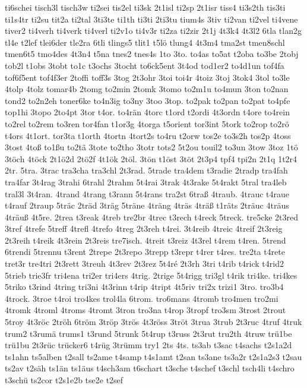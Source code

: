 {ti6schei
tisch3l
tisch3w
ti2sei
tis2el
ti3sk
2t1isl
ti2sp
2t1isr
tiss4
ti3s2th
tis3ti
ti1s4tr
ti2su
tit2a
ti2tal
3ti3te
ti1th
ti3ti
2ti3tu
tium4s
3tiv
ti2van
ti2vel
ti4vene
tiver2
ti4verh
ti4verk
ti4verl
ti2v1o
ti4v3r
ti2za
ti2zir
2t1j
4t3k4
4t3l2
6tla
tlan2g
tl4e
t2lef
tlei6der
tle2ra
6tli
tlings5
tlit1
t5lö
tlung4
4t3m4
tma2st
tmen8schl
tmen6t5
tmo4des
4t3n4
t5na
tnes2
tnes4s
1to
3to.
to4as
to5at
t2oba
to3be
2tobj
tob2l
t1obs
3tobt
to1c
t3ochs
3tocht
to6ck5ent
3t4od
tod1er2
to4d1un
tof4fa
tof6f5ent
tof4f3er
2toffi
toff3s
3tog
2t3ohr
3toi
toi4r
4toiz
3toj
3tok4
3tol
to3le
4tolp
4tolz
tomar4b
2tomg
to2min
2tomk
3tomo
to2m1u
to4mun
3ton
to2nan
tond2
to2n2eh
toner6ke
to4n3ig
to3ny
3too
3top.
to2pak
to2pan
to2pat
to4pfe
top1hi
3topo
2to4pt
3tor
t4or.
to4rän
4torc
t1ord
t2ordi
4t3ordn
t4ore
to4rein
to2rel
to2rem
to3ren
tor4fan
t1or3g
4torga
t5orient
tor3int
5tork
to2rop
to2rö
t4ors
4t1ort.
tor3ta
t1orth
4tortn
4tort2s
to4ru
t2orw
tos2e
to3s2h
tos2p
4toss
3tost
4toß
to1ßu
to2tä
3tote
to2tho
3totr
tots2
5t2ou
touil2
to3un
3tow
3toz
1tö
3töch
4töck
2t1ö2d
2tö2f
4t1ök
2töl.
3tön
t1öst
3töt
2t3p4
tpf4
tpi2n
2t1q
1t2r4
2tr.
5tra.
3trac
tra3cha
tra3chl
2t3rad.
5trade
tra4dem
t3radie
2tradp
tra4fah
tra4far
3t4rag
3trahi
6trahl
2trahm
5t4rai
3trak
4t3rake
5t4rakt
5tral
tra4leb
tral3l
3t4ran.
4trand
4trang
t3rann
5t4rans
tra2st
6traß
4traub.
4trauc
t4raue
t4rauf
2traup
5träc
2träd
3träg
5träne
4träng
4träs
4träß
t1räts
2träuc
4träus
4träuß
4t5re.
2trea
t3reak
4treb
tre2br
4trec
t3rech
t4reck
5treck.
tre5cke
2t3red
3tref
4trefe
5treff
4trefl
4trefo
4treg
2t3reh
t4rei.
3t4reib
4treic
4treif
2t3reig
2t3reih
t4reik
4t3rein
2t3reis
tre7isch.
4treit
t3reiz
4t3rel
t4rem
t4ren.
5trend
6trendi
5trennu
t3rent
2trepe
2t3repo
3trepp
t3repr
t4rer
t4res.
tre2ta
t4rete
tret3r
tre4tri
2t3rett
3treuh
4t3rev
2t3rez
5t4ré
2t3rh
3tri
t4rib
t4rick
t4rid2
5trieb
trie3fr
tri4ena
tri2er
tri4ers
4trig.
2trige
5t4rigg
tri3gl
t4rik
tri4ke.
tri4kes
5triko
t3rind
4tring
tri3ni
4t3rinn
t4rip
4tript
4t5riv
tri2x
trizi1
3tro.
tro3b4
4trock.
3troe
t4roi
tro4kes
trol4la
6trom.
tro6mans
4tromb
tro4men
tro2mi
4tromk
4troml
4troms
4tromt
3tron
tro3na
t4rop
3tropf
tro3sm
3trost
2trout
5troy
4t3röc
2tröh
6tröm
3tröp
3trös
4t3röss
3tröt
3trua
3trub
2t3ruc
4truf
4truk
trum2
t3rumä
trums1
t3rund
5trunk
5t4rup
t3russ
2t3rut
tru2th
4truw
trü1be
trü1bu
2t3rüc
trücker6
t4rüg
3trümm
try1
2ts
4ts.
ts3ab
t3sac
t4sachs
t2s1a2d
ts1ahn
ts5alben
t2sall
ts2ame
t4samp
t4s1amt
t2san
ts3ane
ts3a2r
t2s1a2s3
t2sau
ts2av
t2säh
ts1än
ts1äus
t4sch3am
t6schart
t3sche
t4schef
t3schl
tsch4li
t4schro
t3schü
ts2cor
t2s1e2b
tse2e
t2sef
}
